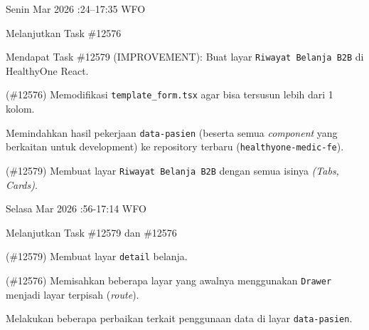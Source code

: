 \begin{logtable}
    {
        Senin  Mar 2026 :24--17:35 \linebreak %
        WFO
    }{
        \begin{loglist}
            \item Melanjutkan Task \#12576
            \item Mendapat Task \#12579 (IMPROVEMENT): Buat layar \texttt{Riwayat Belanja B2B} di
            HealthyOne React.
        \end{loglist}
    }{
        \begin{logwork}
            \item (\#12576) Memodifikasi \texttt{template\_form.tsx} agar bisa tersusun lebih dari 1 kolom.
            \item Memindahkan hasil pekerjaan \texttt{data-pasien} (beserta semua
            \textit{component} yang berkaitan untuk development) ke repository terbaru
            (\texttt{healthyone-medic-fe}).
            \item (\#12579) Membuat layar \texttt{Riwayat Belanja B2B} dengan semua isinya \textit{(Tabs, Cards)}.
        \end{logwork}
    }

    {
        Selasa  Mar 2026 :56-17:14 \linebreak %
        WFO
    }{
        \begin{loglist}
            \item Melanjutkan Task \#12579 dan \#12576
        \end{loglist}
    }{
        \begin{logwork}
            \item (\#12579) Membuat layar \texttt{detail} belanja.
            \item (\#12576) Memisahkan beberapa layar yang awalnya menggunakan \texttt{Drawer} menjadi layar terpisah (\textit{route}).
            \item Melakukan beberapa perbaikan terkait penggunaan data di layar
            \texttt{data-pasien}.
        \end{logwork}
    }


\end{logtable}
